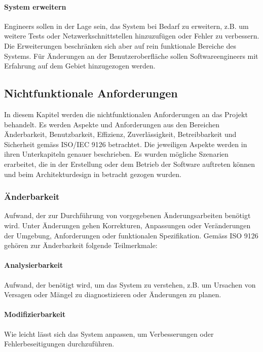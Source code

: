 \documentclass[]{subfiles}
\begin{document}
        \paragraph{System erweitern}
        Engineers sollen in der Lage sein, das System bei Bedarf zu erweitern, 
        z.B. um weitere Tests oder Netzwerkschnittstellen hinzuzufügen oder 
        Fehler zu verbessern. 
        Die Erweiterungen beschränken sich aber auf rein funktionale Bereiche des Systems. 
        Für Änderungen an der Benutzeroberfläche sollen Softwareengineers mit 
        Erfahrung auf dem Gebiet hinzugezogen werden.

    \newpage

    \subsection{Nichtfunktionale Anforderungen}
    In diesem Kapitel werden die nichtfunktionalen Anforderungen an das Projekt behandelt.
    Es werden Aspekte und Anforderungen aus den Bereichen Änderbarkeit, Benutzbarkeit, 
    Effizienz, Zuverlässigkeit, Betreibbarkeit und Sicherheit gemäss ISO/IEC 9126 betrachtet.
	Die jeweiligen Aspekte werden in ihren Unterkapiteln genauer beschrieben.
    Es wurden mögliche Szenarien erarbeitet, die in der Erstellung oder dem Betrieb 
    der Software auftreten können und beim Architekturdesign in betracht gezogen wurden.

	\subsubsection{Änderbarkeit}
		Aufwand, der zur Durchführung von vorgegebenen Änderungsarbeiten benötigt wird.
		Unter Änderungen gehen Korrekturen, Anpassungen oder Veränderungen der Umgebung, Anforderungen oder funktionalen Spezifikation.
		Gemäss ISO 9126 gehören zur Änderbarkeit folgende Teilmerkmale:
		
		\paragraph{Analysierbarkeit}
			Aufwand, der benötigt wird, um das System zu verstehen, z.B. um Ursachen von Versagen oder Mängel zu diagnostizieren oder Änderungen zu planen.

		\paragraph{Modifizierbarkeit}
			Wie leicht lässt sich das System anpassen, um Verbesserungen oder Fehlerbeseitigungen durchzuführen.
\end{document}
